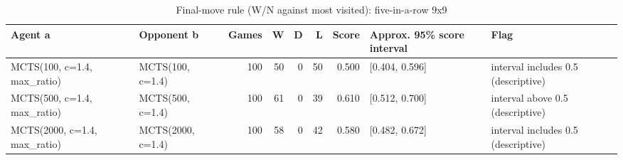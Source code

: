 \begin{table}[!t]
\centering
\caption{Final-move rule (W/N against most visited): five-in-a-row 9x9}
\label{tab:final_gomoku9}
\small
\begin{tabular}{llrrrrrll}
\toprule
Agent a & Opponent b & Games & W & D & L & Score & Approx. 95\% score interval & Flag \\
\midrule
MCTS(100, c=1.4, max\_ratio) & MCTS(100, c=1.4) & 100 & 50 & 0 & 50 & 0.500 & [0.404, 0.596] & interval includes 0.5 (descriptive) \\
MCTS(500, c=1.4, max\_ratio) & MCTS(500, c=1.4) & 100 & 61 & 0 & 39 & 0.610 & [0.512, 0.700] & interval above 0.5 (descriptive) \\
MCTS(2000, c=1.4, max\_ratio) & MCTS(2000, c=1.4) & 100 & 58 & 0 & 42 & 0.580 & [0.482, 0.672] & interval includes 0.5 (descriptive) \\
\bottomrule
\end{tabular}
\end{table}
